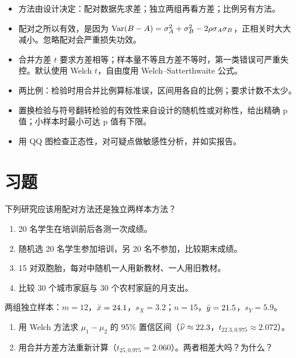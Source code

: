 \begin{summary}
\begin{itemize}
\item 方法由设计决定：配对数据先求差；独立两组再看方差；比例另有方法。
\item 配对之所以有效，是因为 $\operatorname{Var}(B-A)=\sigma_A^2+\sigma_B^2-2\rho\sigma_A\sigma_B$，正相关时大大减小。忽略配对会严重损失功效。
\item 合并方差 $t$ 要求方差相等；样本量不等且方差不等时，第一类错误可严重失控。默认使用 Welch $t$，自由度用 Welch–Satterthwaite 公式。
\item 两比例：检验时用合并比例算标准误，区间用各自的比例；要求计数不太少。
\item 置换检验与符号翻转检验的有效性来自设计的随机性或对称性，给出精确 p 值；小样本时最小可达 p 值有下限。
\item 用 QQ 图检查正态性，对可疑点做敏感性分析，并如实报告。
\end{itemize}
\end{summary}

\section*{习题}

\levelA
\begin{exercise}
下列研究应该用配对方法还是独立两样本方法？
\begin{enumerate}
\item 20 名学生在培训前后各测一次成绩。
\item 随机选 20 名学生参加培训，另 20 名不参加，比较期末成绩。
\item 15 对双胞胎，每对中随机一人用新教材、一人用旧教材。
\item 比较 30 个城市家庭与 30 个农村家庭的月支出。
\end{enumerate}
\end{exercise}

\begin{exercise}
两组独立样本：$m=12$，$\bar{x}=24.1$，$s_X=3.2$；$n=15$，$\bar{y}=21.5$，$s_Y=5.9$。
\begin{enumerate}
\item 用 Welch 方法求 $\mu_1-\mu_2$ 的 95\% 置信区间（$\widehat{\nu}\approx22.3$，$t_{22.3,0.975}\approx2.072$）。
\item 用合并方差方法重新计算（$t_{25,0.975}=2.060$）。两者相差大吗？为什么？
\end{enumerate}
\end{exercise}

